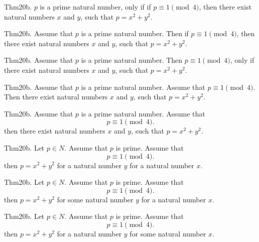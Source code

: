 \documentclass{article}
\begin{document}
Thm20b. $p$ is a prime natural number, only if if $p \equiv 1 \pmod{ 4}$, then there exist natural numbers $x$ and $y$, such that $p = x ^{ 2}+ y ^{ 2}$.

Thm20b. Assume that $p$ is a prime natural number. Then if $p \equiv 1 \pmod{ 4}$, then there exist natural numbers $x$ and $y$, such that $p = x ^{ 2}+ y ^{ 2}$.

Thm20b. Assume that $p$ is a prime natural number. Then $p \equiv 1 \pmod{ 4}$, only if there exist natural numbers $x$ and $y$, such that $p = x ^{ 2}+ y ^{ 2}$.

Thm20b. Assume that $p$ is a prime natural number. Assume that $p \equiv 1 \pmod{ 4}$. Then there exist natural numbers $x$ and $y$, such that $p = x ^{ 2}+ y ^{ 2}$.

Thm20b. Assume that $p$ is a prime natural number. Assume that $$p \equiv 1 \pmod{ 4}.$$ then there exist natural numbers $x$ and $y$, such that $p = x ^{ 2}+ y ^{ 2}$.

Thm20b. Let $p \in N$. Assume that $p$ is prime. Assume that $$p \equiv 1 \pmod{ 4}.$$ then $p = x ^{ 2}+ y ^{ 2}$ for a natural number $y$ for a natural number $x$.

Thm20b. Let $p \in N$. Assume that $p$ is prime. Assume that $$p \equiv 1 \pmod{ 4}.$$ then $p = x ^{ 2}+ y ^{ 2}$ for some natural number $y$ for a natural number $x$.

Thm20b. Let $p \in N$. Assume that $p$ is prime. Assume that $$p \equiv 1 \pmod{ 4}.$$ then $p = x ^{ 2}+ y ^{ 2}$ for a natural number $y$ for some natural number $x$.
\end{document}
